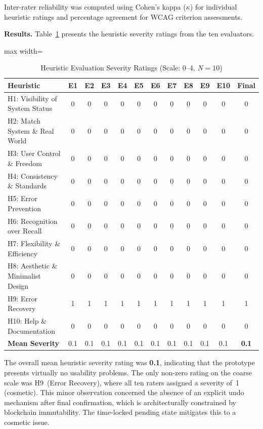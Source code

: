 \documentclass[journal,onecolumn]{IEEEtran}
\begin{document}
Inter-rater reliability was computed using Cohen's kappa ($\kappa$) for
individual heuristic ratings and percentage agreement for WCAG
criterion assessments.

\noindent\textbf{Results.} 
Table~\ref{tab:heuristic-results} presents the heuristic severity
ratings from the ten evaluators.

\begin{table}[htbp]
\centering
\caption{Heuristic Evaluation Severity Ratings (Scale: 0--4, $N=10$)}
\label{tab:heuristic-results}
\small
\begin{adjustbox}{max width=\columnwidth}
\begin{tabular}{|p{3.0cm}|c|c|c|c|c|c|c|c|c|c|c|}
\hline
\textbf{Heuristic} & \textbf{E1} & \textbf{E2} & \textbf{E3} & \textbf{E4} & \textbf{E5} & \textbf{E6} & \textbf{E7} & \textbf{E8} & \textbf{E9} & \textbf{E10} & \textbf{Final} \\
\hline
H1: Visibility of System Status & 0 & 0 & 0 & 0 & 0 & 0 & 0 & 0 & 0 & 0 & 0 \\
\hline
H2: Match System \& Real World & 0 & 0 & 0 & 0 & 0 & 0 & 0 & 0 & 0 & 0 & 0 \\
\hline
H3: User Control \& Freedom & 0 & 0 & 0 & 0 & 0 & 0 & 0 & 0 & 0 & 0 & 0 \\
\hline
H4: Consistency \& Standards & 0 & 0 & 0 & 0 & 0 & 0 & 0 & 0 & 0 & 0 & 0 \\
\hline
H5: Error Prevention & 0 & 0 & 0 & 0 & 0 & 0 & 0 & 0 & 0 & 0 & 0 \\
\hline
H6: Recognition over Recall & 0 & 0 & 0 & 0 & 0 & 0 & 0 & 0 & 0 & 0 & 0 \\
\hline
H7: Flexibility \& Efficiency & 0 & 0 & 0 & 0 & 0 & 0 & 0 & 0 & 0 & 0 & 0 \\
\hline
H8: Aesthetic \& Minimalist Design & 0 & 0 & 0 & 0 & 0 & 0 & 0 & 0 & 0 & 0 & 0 \\
\hline
H9: Error Recovery & 1 & 1 & 1 & 1 & 1 & 1 & 1 & 1 & 1 & 1 & 1 \\
\hline
H10: Help \& Documentation & 0 & 0 & 0 & 0 & 0 & 0 & 0 & 0 & 0 & 0 & 0 \\
\hline
\textbf{Mean Severity} & 0.1 & 0.1 & 0.1 & 0.1 & 0.1 & 0.1 & 0.1 & 0.1 & 0.1 & 0.1 & \textbf{0.1} \\
\hline
\end{tabular}
\end{adjustbox}
\end{table}

The overall mean heuristic severity rating was \textbf{0.1}, indicating
that the prototype presents virtually no usability problems. The only
non-zero rating on the coarse scale was H9~(Error Recovery), where all ten raters assigned a
severity of~1 (cosmetic). This minor observation concerned the absence
of an explicit undo mechanism after final confirmation, which is
architecturally constrained by blockchain immutability. The time-locked
pending state mitigates this to a cosmetic issue.
\end{document}
